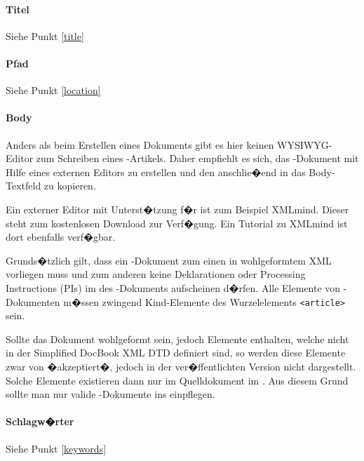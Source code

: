 \paragraph{Titel}
Siehe Punkt \ref{title}

\paragraph{Pfad}
Siehe Punkt \ref{location}

\paragraph{Body}

Anders als beim Erstellen eines Dokuments gibt es hier keinen WYSIWYG-Editor
zum Schreiben eines -Artikels. Daher empfiehlt es sich, das
-Dokument mit Hilfe eines externen Editors zu erstellen und den
 anschlie�end in das Body-Textfeld zu kopieren.

Ein externer Editor mit Unterst�tzung f�r  ist zum Beispiel XMLmind.
Dieser steht zum kostenlosen Download zur Verf�gung. Ein Tutorial zu XMLmind ist
dort ebenfalls verf�gbar.

Grunds�tzlich gilt, dass ein -Dokument zum einen in wohlgeformtem
XML vorliegen muss und zum anderen keine Deklarationen oder Processing
Instructions (PIs) im  des -Dokuments aufscheinen d�rfen. Alle
Elemente von -Dokumenten m�ssen zwingend Kind-Elemente des
Wurzelelements \texttt{<article>} sein.

\begin{Hinweis}
  Sollte das  Dokument wohlgeformt sein, jedoch
  Elemente enthalten, welche nicht in der Simplified DocBook XML DTD
  definiert sind, so werden diese Elemente zwar von 
  �akzeptiert�, jedoch in der ver�ffentlichten Version nicht
  dargestellt. Solche Elemente existieren dann nur im Quelldokument im
  . Aus diesem Grund sollte man nur valide
  -Dokumente ins  einpflegen.
\end{Hinweis}

\paragraph{Schlagw�rter}

Siehe Punkt \ref{keywords}

